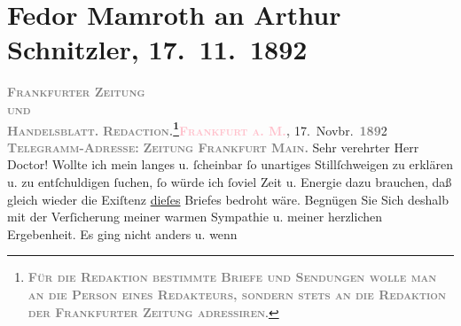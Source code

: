 

               \section[Fedor Mamroth an Arthur Schnitzler, 17. 11. 1892]{ Fedor Mamroth an Arthur Schnitzler, 17. 11. 1892}\nopagebreak{}\rehead{ }\normalsize\beginnumbering{} \toendnotes[C]{\smallbreak\pagebreak[2]} 
\toendnotes[C]{\smallbreak}\pstart
           \noindent{}{\pb}\textcolor{brown}{\textcolor{gray}{\textbf{\textsc{Frankfurter Zeitung}}}{\\}\textsc{\textcolor{gray}{\textbf{und}}}{\\}\textcolor{gray}{\textbf{\textsc{Handelsblatt.}}}}{}\ledrightnote{\textcolor{brown}{Frankfurter Zeitung}}\pend
           \pstart
           \textcolor{gray}{\textbf{\textsc{Redaction.\footnote{\noindent{}\textcolor{gray}{\textbf{\textsc{Für die Redaktion bestimmte
                                                  Briefe und Sendungen wolle man  an die Person eines
                                                  Redakteurs, sondern stets \textbf{an die
                                                  Redaktion der Frankfurter Zeitung}
                                                  adressiren}}}.}}}}\hfill \textcolor{gray}{\textbf{\textsc{\textcolor{pink}{Frankfurt a. M.}{}\ledrightnote{\textcolor{pink}{Frankfurt am Main}},}}}{ }17. Novbr. \textsc{\textcolor{gray}{\textbf{189}}}2\pend
           \pstart
           \textcolor{gray}{\textbf{\textsc{Telegramm-Adresse:}}}\pend
           \pstart
           \textcolor{gray}{\textbf{\textsc{Zeitung Frankfurt Main.}}}\pend
           \pstart{}Sehr verehrter Herr Doctor!\pend\pstart
           Wollte ich mein langes u. ſcheinbar ſo unartiges Stillſchweigen zu erklären u. zu
                    entſchuldigen ſuchen, ſo würde ich ſoviel Zeit u. Energie dazu brauchen, daß
                    gleich wieder die Exiſtenz \uline{dieſes} Briefes
                    bedroht wäre. Begnügen Sie Sich deshalb mit der Verſicherung meiner
                    warmen Sympathie u. meiner herzlichen Ergebenheit. Es ging nicht anders u. wenn
